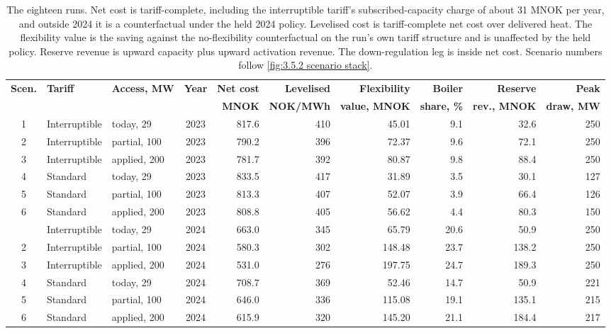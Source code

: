 \begin{table}[htbp]
\centering
\caption{The eighteen runs. Net cost is tariff-complete, including the interruptible tariff's subscribed-capacity charge of about 31 MNOK per year, and outside 2024 it is a counterfactual under the held 2024 policy. Levelised cost is tariff-complete net cost over delivered heat. The flexibility value is the saving against the no-flexibility counterfactual on the run's own tariff structure and is unaffected by the held policy. Reserve revenue is upward capacity plus upward activation revenue. The down-regulation leg is inside net cost. Scenario numbers follow \autoref{fig:3.5.2 scenario stack}.}
\footnotesize
\setlength{\tabcolsep}{3.5pt}
\begin{tabular}{c l l c r r r r r r}
\toprule
\textbf{Scen.} & \textbf{Tariff} & \textbf{Access, MW} & \textbf{Year} & \textbf{Net cost} & \textbf{Levelised} & \textbf{Flexibility} & \textbf{Boiler} & \textbf{Reserve} & \textbf{Peak} \\
 & & & & \textbf{MNOK} & \textbf{NOK/MWh} & \textbf{value, MNOK} & \textbf{share, \%} & \textbf{rev., MNOK} & \textbf{draw, MW} \\
\midrule
1 & Interruptible & today, 29 & 2023 & 817.6 & 410 & 45.01 & 9.1 & 32.6 & 250 \\
2 & Interruptible & partial, 100 & 2023 & 790.2 & 396 & 72.37 & 9.6 & 72.1 & 250 \\
3 & Interruptible & applied, 200 & 2023 & 781.7 & 392 & 80.87 & 9.8 & 88.4 & 250 \\
4 & Standard & today, 29 & 2023 & 833.5 & 417 & 31.89 & 3.5 & 30.1 & 127 \\
5 & Standard & partial, 100 & 2023 & 813.3 & 407 & 52.07 & 3.9 & 66.4 & 126 \\
6 & Standard & applied, 200 & 2023 & 808.8 & 405 & 56.62 & 4.4 & 80.3 & 150 \\
\addlinespace
1 & Interruptible & today, 29 & 2024 & 663.0 & 345 & 65.79 & 20.6 & 50.9 & 250 \\
2 & Interruptible & partial, 100 & 2024 & 580.3 & 302 & 148.48 & 23.7 & 138.2 & 250 \\
3 & Interruptible & applied, 200 & 2024 & 531.0 & 276 & 197.75 & 24.7 & 189.3 & 250 \\
4 & Standard & today, 29 & 2024 & 708.7 & 369 & 52.46 & 14.7 & 50.9 & 221 \\
5 & Standard & partial, 100 & 2024 & 646.0 & 336 & 115.08 & 19.1 & 135.1 & 215 \\
6 & Standard & applied, 200 & 2024 & 615.9 & 320 & 145.20 & 21.1 & 184.4 & 217 \\

\end{tabular}
\end{table}
